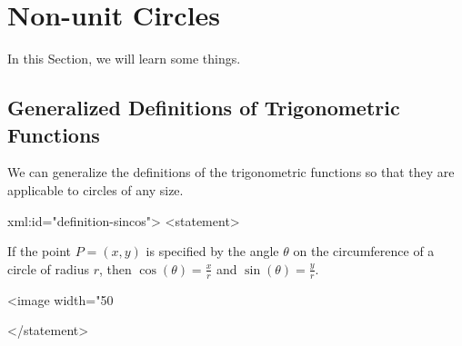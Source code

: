 
\section{Non-unit Circles} \label{supplement-nonunit-circles}
In this Section, we will learn some things.

\subsection*{Generalized Definitions of Trigonometric Functions}

        We can generalize the definitions of the trigonometric functions so that they are applicable to circles of any size.
      
        \begin{myDefinition} xml:id="definition-sincos">
        <statement>
          
            If the point $ P = \left(x,y \right)$ is specified by the angle $\theta$ on the circumference of a circle of radius $r$, then $ \cos (\theta ) = \frac{x}{r} $ and $ \sin (\theta ) = \frac{y}{r} $.
          
          \begin{center}
     \label{fig:nonunitcirclexy}
            \captionsetup{type=figure} 
            <image width="50%
              
              
            
          \end{center}
        </statement>
      \end{myDefinition}
      
